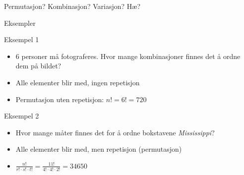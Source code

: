 \begin{frame}[fragile]{Permutasjon? Kombinasjon? Variasjon? Hæ?}
\end{frame}


\begin{frame}{Eksempler}
\begin{block}{Eksempel 1}
\begin{itemize}
\item 6 personer må fotograferes. Hvor mange kombinasjoner finnes det å ordne dem på bildet?
\item Alle elementer blir med, ingen repetisjon 
\item Permutasjon uten repetisjon: $n!=6!=720$
\end{itemize}
\end{block}
\pause
\begin{block}{Eksempel 2}
\begin{itemize}
\item Hvor mange måter finnes det for å ordne bokstavene \textit{Mississippi}?
\item Alle elementer blir med, men repetisjon (permutasjon)
\item $\frac{n!}{r!\cdot s!\cdot t!} =  \frac{11!}{4!\cdot 4!\cdot 2!}=34650$
\end{itemize}
\end{block}
\end{frame}


